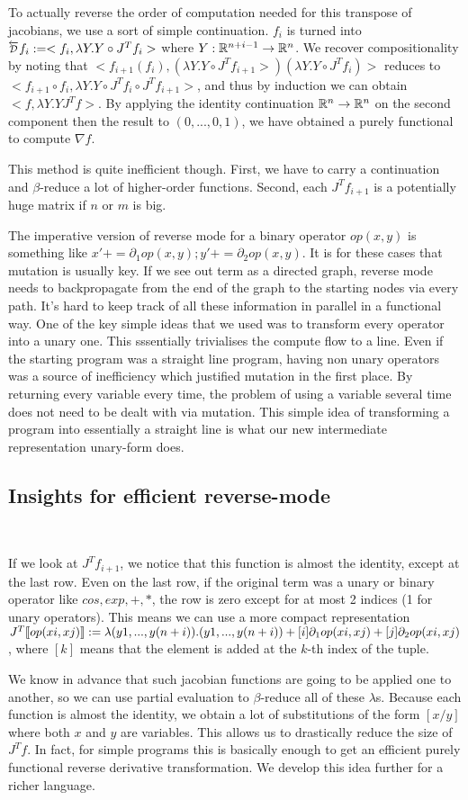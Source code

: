 To actually reverse the order of computation needed for this transpose of jacobians, we use a sort of simple continuation.
$f_i$ is turned into $\Dsynrevsymbol{f_i}:=<f_i, \lambda Y. Y\circ J^Tf_i>$ where $Y:\mathbb{R}^{n+i-1}\to \mathbb{R}^n$. 
We recover compositionality by noting that $<f_{i+1}(f_i), (\lambda Y. Y\circ J^Tf_{i+1}>)(\lambda Y. Y\circ J^Tf_i)>$ reduces to
$<f_{i+1}\circ f_i, \lambda Y. Y\circ J^Tf_i \circ J^Tf_{i+1}>$, and thus by induction we can obtain $<f, \lambda Y. YJ^Tf>$.
By applying the identity continuation $\mathbb{R}^n\to\mathbb{R}^n$ on the second component then the result to $(0,...,0,1)$, 
we have obtained a purely functional to compute $\nabla f$. 

This method is quite inefficient though. First, we have to carry a continuation and $\beta$-reduce a lot of higher-order functions.
Second, each $J^Tf_{i+1}$ is a potentially huge matrix if $n$ or $m$ is big.

The imperative version of reverse mode for a binary operator $op(x,y)$ is something like $x'+= \partial_1op(x,y);y'+= \partial_2op(x,y)$. 
It is for these cases that mutation is usually key. 
If we see out term as a directed graph, reverse mode needs to backpropagate from the end of the graph to the starting nodes via every path.
It's hard to keep track of all these information in parallel in a functional way.
One of the key simple ideas that we used was to transform every operator into a unary one. 
This sssentially trivialises the compute flow to a line. 
Even if the starting program was a straight line program, 
having non unary operators was a source of inefficiency which justified mutation in the first place.
By returning every variable every time, the problem of using a variable several time does not need to be dealt with via mutation. 
This simple idea of transforming a program into essentially a straight line is what our new intermediate representation unary-form does. 

\subsection{Insights for efficient reverse-mode}\
\label{subsec:insights}

If we look at $J^Tf_{i+1}$, we notice that this function is almost the identity, except at the last row. 
Even on the last row, if the original term was a unary or binary operator like $cos, exp, +, *$, 
the row is zero except for at most 2 indices (1 for unary operators).
This means we can use a more compact representation $J^T\llbracket op(xi,xj)\rrbracket:=\lambda (y1,...,y(n+i)).(y1,...,y(n+i))+[i]\partial_1op(xi,xj)+[j]\partial_2op(xi,xj)$, 
where $[k]$ means that the element is added at the $k$-th index of the tuple.

We know in advance that such jacobian functions are going to be applied one to another, so we can use partial evaluation to $\beta$-reduce all of these $\lambda$s.
Because each function is almost the identity, we obtain a lot of substitutions of the form $[x/y]$ where both $x$ and $y$ are variables. 
This allows us to drastically reduce the size of $J^Tf$. In fact, for simple programs this is basically enough to get an efficient purely functional reverse derivative transformation.
We develop this idea further for a richer language.
